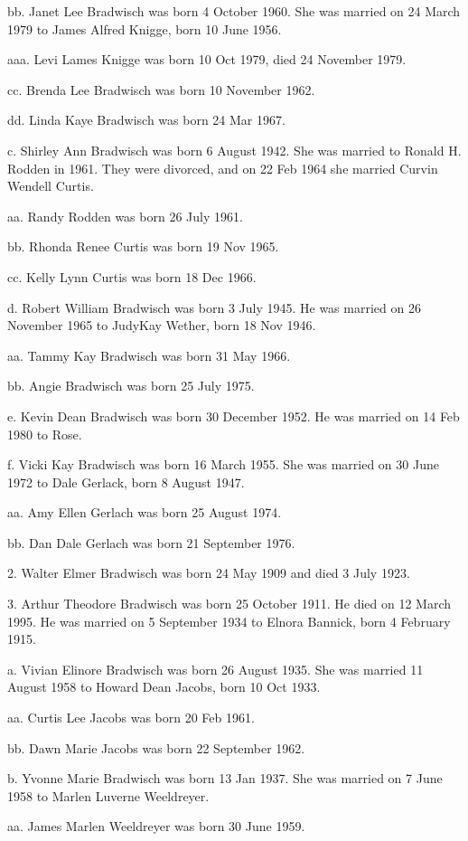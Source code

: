 \documentclass[a4paper]{article}
\begin{document}
bb. Janet Lee Bradwisch was born 4 October 1960.  She was married on 24 March 1979 to James Alfred Knigge, born 10 June 1956.
 
aaa. Levi Lames Knigge was born 10 Oct 1979, died 24 November 1979.
 
cc. Brenda Lee Bradwisch was born 10 November 1962.

dd. Linda Kaye Bradwisch was born 24 Mar 1967.

c. Shirley Ann Bradwisch was born 6 August 1942.  She was married to Ronald H. Rodden in 1961.  They were divorced, and on 22 Feb 1964 she married Curvin Wendell Curtis.
 
aa. Randy Rodden was born 26 July 1961. 

bb. Rhonda Renee  Curtis was born 19 Nov 1965.

cc. Kelly Lynn Curtis was born 18 Dec 1966.

d. Robert William Bradwisch was born 3 July 1945.  He was married on 26 November 1965 to JudyKay Wether, born 18 Nov 1946.
 
aa. Tammy Kay Bradwisch was born 31 May 1966.

bb. Angie Bradwisch was born 25 July 1975.

e. Kevin Dean Bradwisch was born 30 December 1952.  He was married on 14 Feb 1980 to Rose.

f. Vicki Kay Bradwisch was born 16 March 1955.  She was married on 30 June 1972 to Dale Gerlack, born 8 August 1947.
 
aa. Amy Ellen Gerlach was born 25 August 1974.

bb. Dan Dale Gerlach was born 21 September 1976.

2. Walter Elmer Bradwisch was born 24 May 1909 and died 3 July 1923.

3. Arthur Theodore Bradwisch was born 25 October 1911.  He died on 12 March 1995. He was married on 5 September 1934 to Elnora Bannick, born 4 February 1915.

a. Vivian Elinore Bradwisch was born 26 August 1935.  She was married 11 August 1958 to Howard Dean Jacobs, born 10 Oct 1933.

aa. Curtis Lee Jacobs was born 20 Feb 1961.

bb. Dawn Marie Jacobs was born 22 September 1962.

b. Yvonne Marie Bradwisch was born 13 Jan 1937.  She was married on 7 June 1958 to Marlen Luverne Weeldreyer.
 
aa. James Marlen Weeldreyer was born 30 June 1959.
\end{document}
